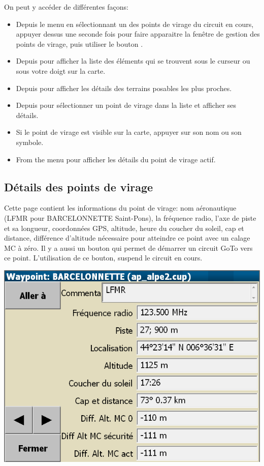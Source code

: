 On peut y accéder de différentes façons:
\begin{itemize}
\item
Depuis le menu \blink{}\blink{} en sélectionnant un des points de virage du circuit en cours, appuyer dessus une seconde fois pour faire apparaitre la fenêtre de gestion des points de virage, puis utiliser le bouton  .

\item
Depuis \blink{} pour afficher la liste des éléments qui se trouvent sous le curseur ou sous votre doigt sur la carte.

\item
Depuis \blink{} pour afficher les détails des terrains posables les plus proches.

\item
Depuis \blink{} pour sélectionner un point de virage dans la liste et afficher ses détails.

\item
Si le point de virage est visible sur la carte, appuyer sur son nom ou son symbole.

\item
From the menu \blink{} pour afficher les détails du point de virage actif.
\end{itemize}



\subsection*{Détails des points de virage}\label{sec:waypointdetails}
Cette page contient les informations du point de virage: nom aéronautique (LFMR pour BARCELONNETTE Saint-Pons), la fréquence radio, l'axe de piste et sa longueur, coordonnées GPS, altitude, heure du coucher du soleil, cap et distance, différence d'altitude nécessaire pour atteindre ce point avec un calage MC à zéro. Il y a aussi un bouton  qui permet de démarrer un circuit GoTo vers ce point. L'utilisation de ce bouton, suspend le circuit en cours.

\begin{center}
\includegraphics[angle=0,width=0.8\linewidth,keepaspectratio='true']{figures/dialog-waypointdetails0.png}
\end{center}

